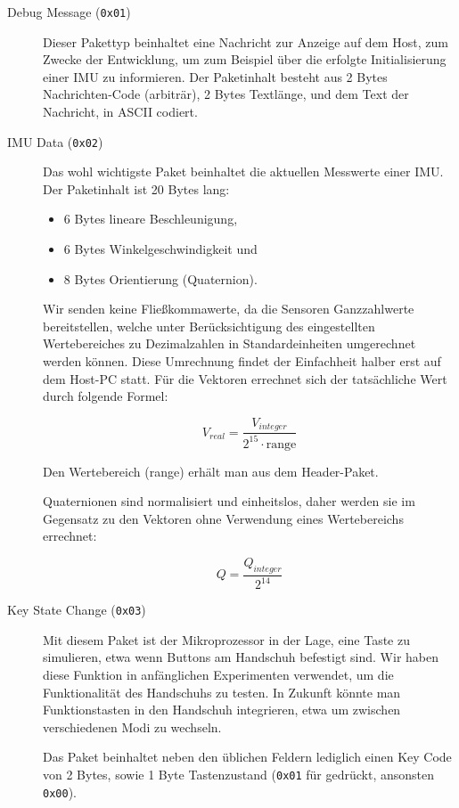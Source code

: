 \begin{description}
    \item[Debug Message (\texttt{0x01})]
        Dieser Pakettyp beinhaltet eine Nachricht zur Anzeige auf dem Host, zum
        Zwecke der Entwicklung, um zum Beispiel über die erfolgte Initialisierung
        einer IMU zu informieren. Der Paketinhalt besteht aus 2 Bytes
        Nachrichten-Code (arbiträr), 2 Bytes Textlänge, und dem Text der
        Nachricht, in ASCII codiert.

    \item[IMU Data (\texttt{0x02})]
        Das wohl wichtigste Paket beinhaltet die aktuellen Messwerte einer IMU.
        Der Paketinhalt ist 20 Bytes lang:

        \begin{itemize}[noitemsep]
            \item 6 Bytes lineare Beschleunigung,
            \item 6 Bytes Winkelgeschwindigkeit und
            \item 8 Bytes Orientierung (Quaternion).
        \end{itemize}


        Wir senden keine Fließkommawerte, da die Sensoren Ganzzahlwerte
        bereitstellen, welche unter Berücksichtigung des eingestellten
        Wertebereiches zu Dezimalzahlen in Standardeinheiten umgerechnet werden
        können. Diese Umrechnung findet der Einfachheit halber erst auf dem
        Host-PC statt.  Für die Vektoren errechnet sich der tatsächliche Wert
        durch folgende Formel:

        $$V_{real} = \frac{V_{integer}}{2^{15} \cdot \text{range}}$$

        Den Wertebereich (range) erhält man aus dem Header-Paket.

        Quaternionen sind normalisiert und einheitslos, daher werden sie im
        Gegensatz zu den Vektoren ohne Verwendung eines Wertebereichs
        errechnet:

        $$Q = \frac{Q_{integer}}{2^{14}}$$

    \item[Key State Change (\texttt{0x03})]
        Mit diesem Paket ist der Mikroprozessor in der Lage, eine Taste zu
        simulieren, etwa wenn Buttons am Handschuh befestigt sind. Wir haben
        diese Funktion in anfänglichen Experimenten verwendet, um die
        Funktionalität des Handschuhs zu testen. In Zukunft könnte man
        Funktionstasten in den Handschuh integrieren, etwa um zwischen
        verschiedenen Modi zu wechseln.

        Das Paket beinhaltet neben den üblichen Feldern lediglich einen Key
        Code von 2 Bytes, sowie 1 Byte Tastenzustand (\texttt{0x01} für gedrückt,
        ansonsten \texttt{0x00}).
\end{description}

